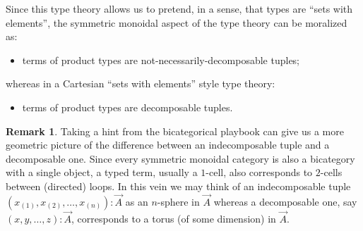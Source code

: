 \documentclass[pra,floatfix,
amsmath,superscriptaddress, 12pt]{article}
\theoremstyle{definition}
\newtheorem*{remark}{Remark}
\begin{document}
Since this type theory allows us to pretend, in a sense, that types are ``sets with elements'', the symmetric monoidal aspect of the type theory can be moralized as:
\begin{itemize}
    \item terms of product types are not-necessarily-decomposable tuples;
\end{itemize}
whereas in a Cartesian ``sets with elements'' style type theory:
\begin{itemize}
    \item terms of product types are decomposable tuples.
\end{itemize}

\begin{remark}
Taking a hint from the bicategorical playbook can give us a more geometric picture of the difference between an indecomposable tuple and a decomposable one. Since every symmetric monoidal category is also a bicategory with a single object, a typed term, usually a $1$-cell, also corresponds to $2$-cells between (directed) loops. In this vein we may think of an indecomposable tuple $(x_{(1)},x_{(2)},\dots,x_{(n)}):\overrightarrow{A}$ as an $n$-sphere in $\overrightarrow{A}$ whereas a decomposable one, say $(x,y,\dots,z):\overrightarrow{A}$, corresponds to a torus (of some dimension) in  $\overrightarrow{A}$.
\end{remark}







\end{document}
